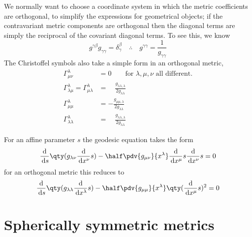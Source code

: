 We normally want to choose a coordinate system in which the metric
coefficients are orthogonal, to simplify the expressions for
geometrical objects; if the contravariant metric components are
orthogonal then the diagonal terms are simply the reciprocal of the
covariant diagonal terms. To see this, we know
\begin{equation*}
  g^{\gamma \beta} g_{\gamma\gamma} = \delta^{\beta}_{\gamma} \quad\therefore \quad  g^{\gamma\gamma} = \frac{1}{g_{\gamma \gamma}}
\end{equation*}
The Christoffel symbols also take a simple form in an orthogonal
metric,
\begin{subequations}
  \begin{align}
    \label{eq:109}
    \Gamma^{\lambda}_{\mu \nu} &= 0 \qquad \text{for } \lambda, \mu, \nu \text{ all different.} \\
    \Gamma^{\lambda}_{\lambda \mu} = \Gamma^{\lambda}_{\mu \lambda} &= \quad \frac{g_{\lambda\lambda , \lambda}}{2 g_{\lambda \lambda}}\\
    \Gamma^{\lambda}_{\mu \mu} &= - \frac{g_{\mu \mu, \lambda}}{2 g_{\lambda \lambda}} \\
    \Gamma^{\lambda}_{\lambda \lambda} &= \quad \frac{g_{\lambda
        \lambda, \lambda}}{2 g_{\lambda \lambda}}
  \end{align}
\end{subequations}

For an affine parameter $s$ the geodesic equation takes the form
\begin{equation*}
  \dv{s} \qty( g_{\lambda \nu} \dv{x^{\nu}}{s} ) - \half \pdv{g_{\mu \nu}}{x^{\lambda}} \dv{x^{\mu}}{s} \dv{x^{\nu}}{s} = 0
\end{equation*}
for an orthogonal metric this reduces to
\begin{equation}
  \label{eq:112}
  \dv{s} \qty( g_{\lambda \lambda} \dv{x^{\lambda}}{s} ) - \half 
  \pdv{g_{\mu \mu}}{x^{\lambda}} \qty( \dv{x^{\mu}}{s} )^2 = 0
\end{equation}

\section{Spherically symmetric metrics}
\label{sec:spher-symm-matr}

